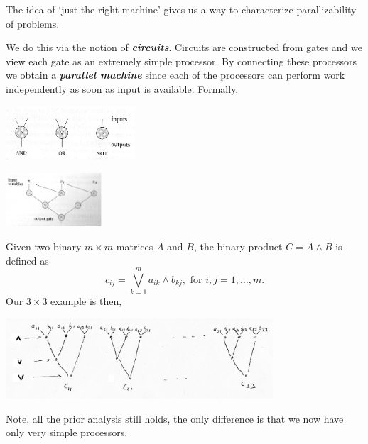 \documentclass[a4paper,blends,pdf,colorBG,slideColor]{prosper}
\begin{document}
{\small
The idea of `just the right machine' gives us a way to characterize parallizability of problems.

We do this via the notion of {\bf\em circuits}.  Circuits are constructed from gates and we view each gate as an extremely simple processor.  By connecting these processors we obtain a {\bf\em parallel machine} since each of the processors can perform work independently as soon as input is available. Formally,

\begin{center}
\includegraphics[height=20mm]{images/circuit-elements.eps}
\end{center}

\begin{center}
\includegraphics[height=20mm]{images/circuit.eps}
\end{center}

}
\es

{\small
Given two binary $m\times m$ matrices $A$ and $B$, the binary product $C = A \wedge B$ is
defined as
\[
c_{ij} = \bigvee_{k = 1}^m a_{ik} \wedge b_{kj}, \mbox{ for $i,j = 1,\ldots,m$}.
\]
Our $3\times 3$ example is then,
\begin{center}
\includegraphics[height=30mm]{images/pmult-bin.eps}
\end{center}
Note, all the prior analysis still holds, the only difference is that we now have only very simple processors.
}
\es
\end{document}
